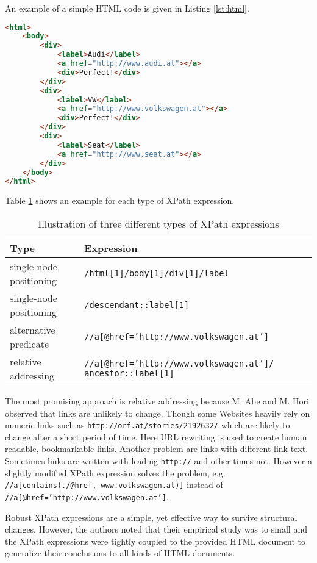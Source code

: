 \documentclass[12pt, notitlepage]{article}
\begin{document}
An example of a simple HTML code is given in Listing  \ref{lst:html}.
\begin{lstlisting}[language=HTML, caption={HTML code listing used as source for XPath expressions},label=lst:html]
<html>
	<body>
		<div>
			<label>Audi</label>
			<a href="http://www.audi.at"></a>
			<div>Perfect!</div>
		</div>
		<div>
			<label>VW</label>
			<a href="http://www.volkswagen.at"></a>
			<div>Perfect!</div>
		</div>
		<div>
			<label>Seat</label>
			<a href="http://www.seat.at"></a>
		</div>
	</body>
</html>
\end{lstlisting}
\vspace{1cm}
Table \ref{tab:xPath-expressions} shows an example for each type of XPath expression.
\begin{table}[H]
	\begin{tabularx}{\textwidth}{l|X}
		\textbf{Type} & \textbf{Expression} \\
		\hline
		single-node positioning & \texttt{/html[1]/body[1]/div[1]/label} \\
		single-node positioning & \texttt{/descendant::label[1]} \\
		alternative predicate & \texttt{//a[@href='http://www.volkswagen.at']} \\
		relative addressing & \texttt{//a[@href='http://www.volkswagen.at']/ ancestor::label[1]} \\
	\end{tabularx}
	\caption{Illustration of three different types of XPath expressions}
	\label{tab:xPath-expressions}
\end{table}
The most promising approach is relative addressing because M. Abe and M. Hori observed that links are unlikely to change. 
Though some Websites heavily rely on numeric links such as \texttt{http://orf.at/stories/2192632/} which are likely to change after a short period of time. Here URL rewriting 
is used to create human readable, bookmarkable links. Another problem are links with different link text. Sometimes links are written with leading \texttt{http://} and other times not. However a slightly modified XPath expression solves the problem, e.g.
\texttt{//a[contains(./@href, www.volkswagen.at)]} instead of \texttt{//a[@href='http://www.volkswagen.at']}.

Robust XPath expressions are a simple, yet effective way to survive structural changes. However, the authors noted that their empirical study was to small and the XPath expressions were tightly coupled to the provided HTML document to generalize their conclusions to all kinds of HTML documents.  
\end{document}
